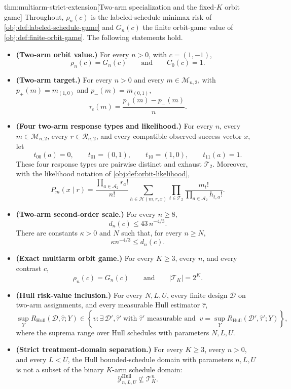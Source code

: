 \documentclass[11pt]{article}
\begin{document}
\begin{theoremv}{thm:multiarm-strict-extension}[Two-arm specialization and the fixed-$K$ orbit game]
Throughout, \(\rho_n(c)\) is the labeled-schedule minimax risk of \cref{obj:def:labeled-schedule-game} and \(G_n(c)\) the finite orbit-game value of \cref{obj:def:finite-orbit-game}.
The following statements hold.
\begin{itemize}
\item \textbf{(Two-arm orbit value.)} For every \(n>0\), with \(c=(1,-1)\),
\[
\rho_n(c)=G_n(c)
\qquad\text{and}\qquad
C_0(c)=1 .
\]
\item \textbf{(Two-arm target.)} For every \(n>0\) and every \(m\in\mathcal M_{n,2}\), with \(p_+(m)=m_{(1,0)}\) and \(p_-(m)=m_{(0,1)}\),
\[
\tau_c(m)=\frac{p_+(m)-p_-(m)}{n}.
\]
\item \textbf{(Four two-arm response types and likelihood.)} For every \(n\), every \(m\in\mathcal M_{n,2}\), every \(r\in\mathcal R_{n,2}\), and every compatible observed-success vector \(x\), let
\[
t_{00}(a)=0,\qquad
t_{01}= (0,1),\qquad
t_{10}= (1,0),\qquad
t_{11}(a)=1 .
\]
These four response types are pairwise distinct and exhaust \(\mathcal T_2\). Moreover, with the likelihood notation of \cref{obj:def:orbit-likelihood},
\[
P_m(x\mid r)
=
\frac{\prod_{a\in\mathcal A_2} r_a!}{n!}
\sum_{h\in\mathcal H(m,r,x)}
\prod_{t\in\mathcal T_2}
\frac{m_t!}{\prod_{a\in\mathcal A_2} h_{t,a}!}.
\]
\item \textbf{(Two-arm second-order scale.)} For every \(n\ge 8\),
\[
d_n(c)\le 43\, n^{-4/3}.
\]
There are constants \(\kappa>0\) and \(N\) such that, for every \(n\ge N\),
\[
\kappa n^{-4/3}\le d_n(c).
\]
\item \textbf{(Exact multiarm orbit game.)} For every \(K\ge 3\), every \(n\), and every contrast \(c\),
\[
\rho_n(c)=G_n(c)
\qquad\text{and}\qquad
|\mathcal T_K|=2^K .
\]
\item \textbf{(Hull risk-value inclusion.)} For every \(N,L,U\), every finite design \(\mathcal D\) on two-arm assignments, and every measurable Hull estimator \(\widehat\tau\),
\[
\sup_{Y} R_{\mathrm{Hull}}(\mathcal D,\widehat\tau;Y)
\in
\left\{
v:\exists\,\mathcal D',\widehat\tau'\ \text{with \(\widehat\tau'\) measurable and }\
v=\sup_Y R_{\mathrm{Hull}}(\mathcal D',\widehat\tau';Y)
\right\},
\]
where the suprema range over Hull schedules with parameters \(N,L,U\).
\item \textbf{(Strict treatment-domain separation.)} For every \(K\ge 3\), every \(n>0\), and every \(L<U\), the Hull bounded-schedule domain with parameters \(n,L,U\) is not a subset of the binary \(K\)-arm schedule domain:
\[
\mathcal Y^{\mathrm{Hull}}_{n,L,U}\nsubseteq \mathcal T_K^n .
\]
\end{itemize}
\end{theoremv}
\end{document}
